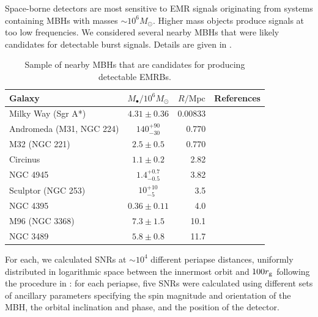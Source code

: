 Space-borne detectors are most sensitive to EMR signals originating from systems containing MBHs with masses $\sim10^6 M_\odot$. Higher mass objects produce signals at too low frequencies. We considered several nearby MBHs that were likely candidates for detectable burst signals. Details are given in .
\begin{table}\footnotesize
 \centering
  \begin{tabular}{P{0.22\textwidth} c  D{.}{.}{2.5} P{0.4\textwidth}}
  \toprule
   Galaxy &  &  & References \\
 \midrule
 Milky Way (Sgr A*) & $4.31 \pm 0.36$ & 0.00833 & \citet{Gillessen2009} \\
 Andromeda (M31, NGC 224) & $140^{+90}_{-30}$ & 0.770 & \citet{Bender2005,Karachentsev2004} \\
 M32 (NGC 221) & $2.5 \pm 0.5$ & 0.770 & \citet{Verolme2002,Karachentsev2004} \\
 Circinus & $1.1 \pm 0.2$ & 2.82 & \citet{Graham2008,Greenhill2003,Karachentsev2007} \\
 NGC 4945 & $1.4^{+0.7}_{-0.5}$ & 3.82 & \citet{Greenhill1997,Ferrarese2005,Karachentsev2007} \\
 Sculptor (NGC 253) & $10^{+10}_{-5}$ & 3.5 & \citet{Graham2011,Rodriguez-Rico2006,Rekola2005} \\
 NGC 4395 & $0.36 \pm 0.11$ & 4.0 & \citet{Peterson2005,Thim2004} \\
 M96 (NGC 3368) & $7.3 \pm 1.5$ & 10.1 & \citet{Graham2011,Nowak2010,Tonry2001} \\
 NGC 3489 & $5.8 \pm 0.8$ & 11.7 & \citet{Graham2011,Nowak2010,Tonry2001} \\
\bottomrule
\end{tabular}
\caption{Sample of nearby MBHs that are candidates for producing detectable EMRBs.\label{tab:MBHs}}
\end{table}
For each, we calculated SNRs at $\sim 10^4$ different periapse distances, uniformly distributed in logarithmic space between the innermost orbit and $100 r_\mathrm{g}$ following the procedure in : for each periapse, five SNRs were calculated using different sets of ancillary parameters specifying the spin magnitude and orientation of the MBH, the orbital inclination and phase, and the position of the detector.

